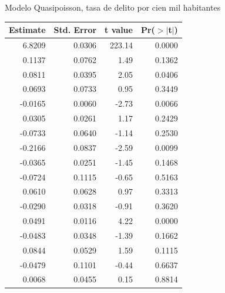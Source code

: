 \documentclass[ignorenonframetext,]{beamer}
\begin{document}
\begin{frame}{Modelo Quasipoisson, tasa de delito por cien mil
habitantes}

\begin{table}[ht]
\centering
{\small
\begin{tabular}{rrrr}
  \hline
Estimate & Std. Error & t value & Pr($>$$|$t$|$) \\ 
  \hline
6.8209 & 0.0306 & 223.14 & 0.0000 \\ 
  0.1137 & 0.0762 & 1.49 & 0.1362 \\ 
  0.0811 & 0.0395 & 2.05 & 0.0406 \\ 
  0.0693 & 0.0733 & 0.95 & 0.3449 \\ 
  -0.0165 & 0.0060 & -2.73 & 0.0066 \\ 
  0.0305 & 0.0261 & 1.17 & 0.2429 \\ 
  -0.0733 & 0.0640 & -1.14 & 0.2530 \\ 
  -0.2166 & 0.0837 & -2.59 & 0.0099 \\ 
  -0.0365 & 0.0251 & -1.45 & 0.1468 \\ 
  -0.0724 & 0.1115 & -0.65 & 0.5163 \\ 
  0.0610 & 0.0628 & 0.97 & 0.3313 \\ 
  -0.0290 & 0.0318 & -0.91 & 0.3620 \\ 
  0.0491 & 0.0116 & 4.22 & 0.0000 \\ 
  -0.0483 & 0.0348 & -1.39 & 0.1662 \\ 
  0.0844 & 0.0529 & 1.59 & 0.1115 \\ 
  -0.0479 & 0.1101 & -0.44 & 0.6637 \\ 
  0.0068 & 0.0455 & 0.15 & 0.8814 \\ 
   \hline
\end{tabular}
}
\end{table}

\end{frame}
\end{document}
